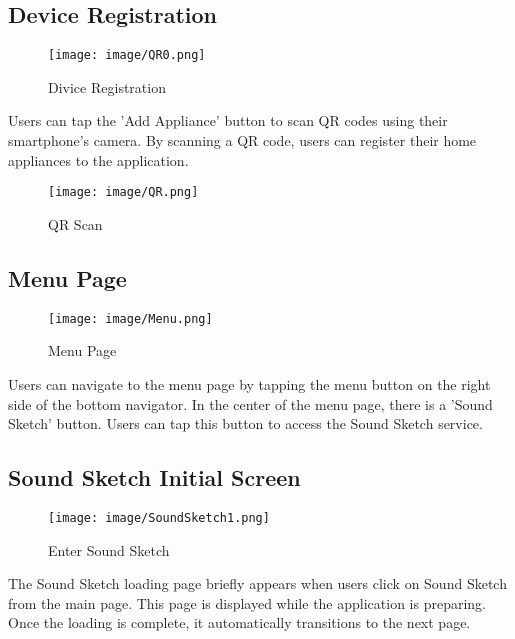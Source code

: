 \documentclass[conference]{IEEEtran}
\begin{document}
\clearpage

\subsection{Device Registration}

\begin{figure}[h!]
    \centering
    \texttt{[image: image/QR0.png]}
    \caption{Divice Registration}
    \label{fig:enter-label}
\end{figure}

\noindent Users can tap the 'Add Appliance' button to scan QR codes using their smartphone's camera. By scanning a QR code, users can register their home appliances to the application.\\


\begin{figure}[h!]
    \centering
    \texttt{[image: image/QR.png]}
    \caption{QR Scan}
    \label{fig:enter-label}
\end{figure}




\subsection{Menu Page}
\begin{figure}
    \centering
    \texttt{[image: image/Menu.png]}
    \caption{Menu Page}
    \label{fig:enter-label}
\end{figure}

\noindent Users can navigate to the menu page by tapping the menu button on the right side of the bottom navigator. In the center of the menu page, there is a 'Sound Sketch' button.
Users can tap this button to access the Sound Sketch service.\\ 


\subsection{Sound Sketch Initial Screen}
\begin{figure}[h!]
    \centering
    \texttt{[image: image/SoundSketch1.png]}
    \caption{Enter Sound Sketch}
    \label{fig:enter-label}
\end{figure}

\noindent The Sound Sketch loading page briefly appears when users click on Sound Sketch from the main page. This page is displayed while the application is preparing. Once the loading is complete, it automatically transitions to the next page.\\
\end{document}
